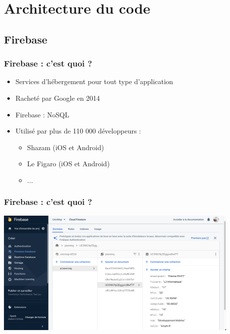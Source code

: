 \documentclass{beamer}
\begin{document}
%
%
\section{Architecture du code}
%
%

\subsection{Firebase}
  \begin{frame}
    \frametitle{Firebase : c'est quoi ?}

    \begin{itemize}
      \item Services d'hébergement pour tout type d'application
      \item Racheté par Google en 2014
      \item Firebase : NoSQL
      \item Utilisé par plus de 110 000 développeurs :
      \begin{itemize}
        \item Shazam (iOS et Android)
        \item Le Figaro (iOS et Android)
        \item ...
      \end{itemize}
    \end{itemize}

  \end{frame}

  \begin{frame}
    \frametitle{Firebase : c'est quoi ?}

    \begin{center}
      \includegraphics[width=120mm, scale=0.5]{firebase.png}
    \end{center}

  \end{frame}
\end{document}
